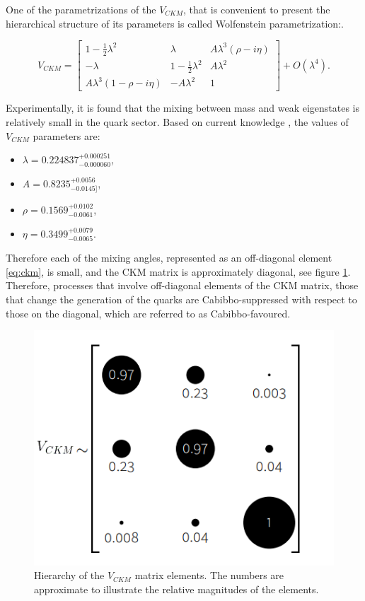 One of the parametrizations of the $V_{CKM}$, that is convenient to present the hierarchical structure of its parameters is called Wolfenstein \cite{wolfenstein} parametrization:.

\begin{equation}
\label{eq:wolfenstein}
   V_{CKM} =  \begin{bmatrix} 1-\tfrac{1}{2}\lambda^2 & \lambda & A\lambda^3(\rho-i\eta) \\
 -\lambda & 1-\tfrac{1}{2}\lambda^2 & A\lambda^2 \\
 A\lambda^3(1-\rho-i\eta) & -A\lambda^2 & 1  \end{bmatrix} + O(\lambda^4).
\end{equation}


Experimentally, it is found that the mixing between mass and weak eigenstates is relatively small in the quark sector. Based on current knowledge \cite{CKMFitter}, the values of $V_{CKM}$ parameters are:
\begin{itemize}
\item $\lambda=0.224837^{+0.000251}_{-0.000060}$,
 \item  $A= 0.8235^{+0.0056}_{-0.0145]}$, 
 \item  $\rho=0.1569^{+0.0102}_{-0.0061}$,
 \item  $\eta=0.3499^{+0.0079}_{-0.0065}$.
\end{itemize}

 Therefore each of the mixing angles, represented as an off-diagonal element \ref{eq:ckm}, is small, and the CKM matrix is approximately diagonal, see figure \ref{fig:ckm_magnitudes}. Therefore, processes that involve off-diagonal elements of the CKM matrix, those that change the generation of the quarks are Cabibbo-suppressed with respect to those on the diagonal, which are referred to as Cabibbo-favoured.



\begin{figure}[h]
\centering
\includegraphics[scale=0.5]{figures/ckm_structure.PNG}
\caption{Hierarchy of the $V_{CKM}$ matrix elements. The numbers are approximate to illustrate the relative magnitudes of the elements.  
\label{fig:ckm_magnitudes}}
\end{figure}



